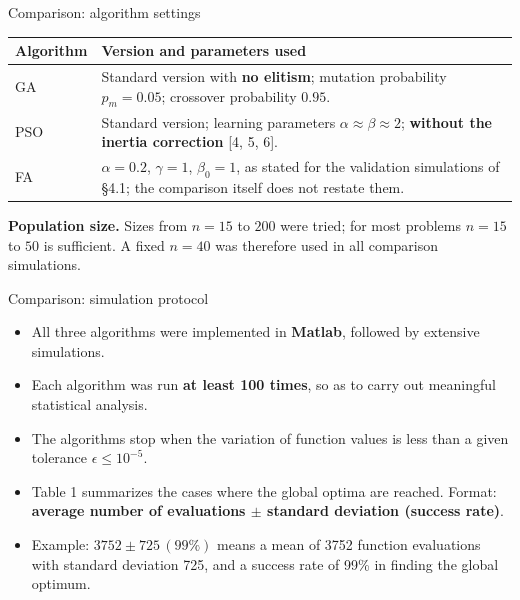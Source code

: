 \documentclass[aspectratio=169,11pt]{beamer}
\begin{document}
\begin{frame}[t]{Comparison: algorithm settings}
\begin{center}\small
\begin{tabular}{@{}p{}p{}@{}}
\toprule
\textbf{Algorithm} & \textbf{Version and parameters used}\\\midrule
GA  & Standard version with \textbf{no elitism}; mutation probability $p_m=0.05$; crossover probability $0.95$.\\[0.4em]
PSO & Standard version; learning parameters $\alpha\approx\beta\approx2$; \textbf{without the inertia correction} [4, 5, 6].\\[0.4em]
FA  & $\alpha=0.2$, $\gamma=1$, $\beta_0=1$, as stated for the validation simulations of \S4.1; the comparison itself does not restate them.\\
\bottomrule
\end{tabular}
\end{center}
\vspace{0.6em}
\textbf{Population size.} Sizes from $n=15$ to $200$ were tried; for most problems $n=15$ to $50$ is sufficient. A fixed \textbf{$n=40$} was therefore used in all comparison simulations.
\end{frame}

\begin{frame}[t]{Comparison: simulation protocol}
\begin{itemize}\itemsep0.7em
  \item All three algorithms were implemented in \textbf{Matlab}, followed by extensive simulations.
  \item Each algorithm was run \textbf{at least 100 times}, so as to carry out meaningful statistical analysis.
  \item The algorithms stop when the variation of function values is less than a given tolerance $\epsilon\le10^{-5}$.
  \item Table 1 summarizes the cases where the global optima are reached. Format: \textbf{average number of evaluations $\pm$ standard deviation (success rate)}.
  \item Example: $3752\pm725\,(99\%)$ means a mean of 3752 function evaluations with standard deviation 725, and a success rate of 99\% in finding the global optimum.
\end{itemize}
\end{frame}
\end{document}
